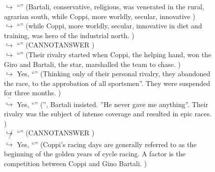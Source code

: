 \documentclass[11pt,a4paper, onecolumn]{article}
\begin{document}
\begin{figure}[t] \small \begin{tcolorbox}[boxsep=0pt,left=5pt,right=0pt,top=2pt,colback = yellow!5] \begin{dialogue}
 \small 
\colorbox{pink!25}{$\hookrightarrow$}
{ ``'' (Bartali, conservative, religious, was venerated in the rural, agrarian south, while Coppi, more worldly, secular, innovative ) }
\\
\colorbox{pink!25}{$\hookrightarrow$}
{ ``'' (while Coppi, more worldly, secular, innovative in diet and training, was hero of the industrial north. ) }
\\
\colorbox{pink!25}{$\hookrightarrow$}
{ ``'' (CANNOTANSWER ) }
\\
\colorbox{pink!25}{$\hookrightarrow$}
{ ``'' (Their rivalry started when Coppi, the helping hand, won the Giro and Bartali, the star, marshalled the team to chase. ) }
\\
\colorbox{pink!25}{$\hookrightarrow$}
\colorbox{red!25}{Yes,}
{ ``'' (Thinking only of their personal rivalry, they abandoned the race, to the approbation of all sportsmen''. They were suspended for three months. ) }
\\
\colorbox{pink!25}{ $\bar{\hookrightarrow}$}
\colorbox{red!25}{Yes,}
{ ``'' ('', Bartali insisted. ''He never gave me anything''. Their rivalry was the subject of intense coverage and resulted in epic races. ) }
\\
\colorbox{pink!25}{$\not\hookrightarrow$}
{ ``'' (CANNOTANSWER ) }
\\
\colorbox{pink!25}{ $\bar{\hookrightarrow}$}
\colorbox{red!25}{Yes,}
{ ``'' (Coppi's racing days are generally referred to as the beginning of the golden years of cycle racing. A factor is the competition between Coppi and Gino Bartali. ) }
\\
 \end{dialogue}\end{tcolorbox}\end{figure}
\end{document}
